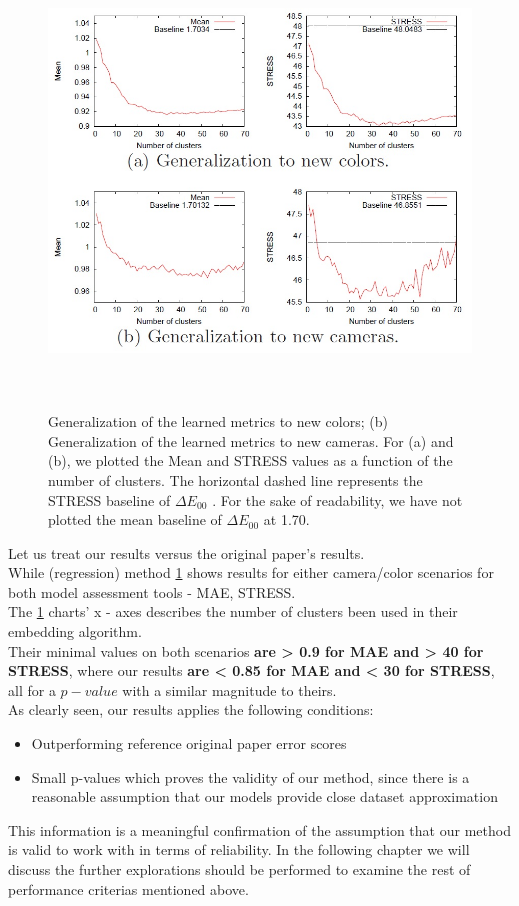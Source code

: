\begin{figure}[h] 
	\includegraphics[width=\linewidth,height=12cm,keepaspectratio]{Figures/original_paper_results}
	\caption[orig res]
	{Generalization of the learned metrics to new colors; (b) Generalization of
		the learned metrics to new cameras. For (a) and (b), we plotted the Mean and STRESS
		values as a function of the number of clusters. The horizontal dashed line represents
		the STRESS baseline of $\Delta E_{00}$ . For the sake of readability, we have not plotted the
		mean baseline of $\Delta E_{00}$ at 1.70.}
	\label{original paper results}			
\end{figure}


Let us treat our results versus the original paper's results.\\

While \cite{prep_color} (regression) method
\ref{original paper results} shows results for either camera/color scenarios for both model assessment tools - MAE, STRESS. \\
The \ref{original paper results} charts' x - axes describes the number of clusters been used in their embedding algorithm. \\
Their minimal values on both scenarios\textbf{ are > 0.9 for MAE and > 40 for STRESS}, where our results \textbf{ are < 0.85 for MAE and < 30 for STRESS}, all for a $p - value$ with a similar magnitude to theirs. \\
As clearly seen, our results applies the following conditions:
\begin{itemize}
	\item Outperforming reference original paper error scores
	\item Small p-values which proves the validity of our method, since there is a reasonable assumption that our models provide close dataset approximation
\end{itemize}

This information is a meaningful confirmation of the assumption that our method is valid to work with in terms of reliability. In the following chapter we will discuss the further explorations should be performed to examine the rest of performance criterias mentioned above.
